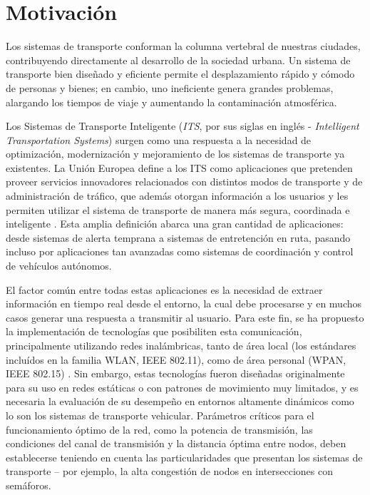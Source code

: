\section{Motivación}

Los sistemas de transporte conforman la columna vertebral de nuestras ciudades, contribuyendo directamente al desarrollo de la sociedad urbana. Un sistema de transporte bien diseñado y eficiente permite el desplazamiento rápido y cómodo de personas y bienes; en cambio, uno ineficiente genera grandes problemas, alargando los tiempos de viaje y aumentando la contaminación atmosférica.

Los Sistemas de Transporte Inteligente (\emph{ITS}, por sus siglas en inglés - \emph{Intelligent Transportation Systems}) surgen como una respuesta a la necesidad de optimización, modernización y mejoramiento de los sistemas de transporte ya existentes. La Unión Europea define a los ITS como aplicaciones que pretenden proveer servicios innovadores relacionados con distintos modos de transporte y de administración de tráfico, que además otorgan información a los usuarios y les permiten utilizar el sistema de transporte de manera más segura, coordinada e inteligente \cite{eudirective}. Esta amplia definición abarca una gran cantidad de aplicaciones: desde sistemas de alerta temprana a sistemas de entretención en ruta, pasando incluso por aplicaciones tan avanzadas como sistemas de coordinación y control de vehículos autónomos.


El factor común entre todas estas aplicaciones es la necesidad de extraer información en tiempo real desde el entorno, la cual debe procesarse y en muchos casos generar una respuesta a transmitir al usuario. Para este fin, se ha propuesto la implementación de tecnologías que posibiliten esta comunicación, principalmente utilizando redes inalámbricas, tanto de área local (los estándares incluídos en la familia WLAN, IEEE 802.11), como de área personal (WPAN, IEEE 802.15) \cite{80211dailey,80215vanet,80211wave}. Sin embargo, estas tecnologías fueron diseñadas originalmente para su uso en redes estáticas o con patrones de movimiento muy limitados, y es necesaria la evaluación de su desempeño en entornos altamente dinámicos como lo son los sistemas de transporte vehicular. Parámetros críticos para el funcionamiento óptimo de la red, como la potencia de transmisión, las condiciones del canal de transmisión y la distancia óptima entre nodos, deben establecerse teniendo en cuenta las particularidades que presentan los sistemas de transporte -- por ejemplo, la alta congestión de nodos en intersecciones con semáforos.

